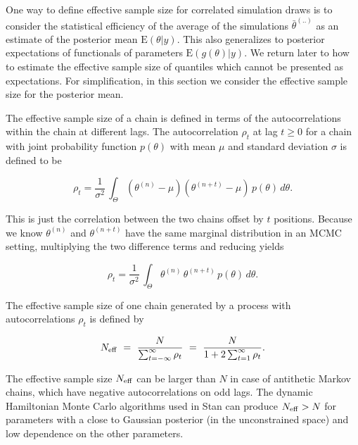 \documentclass[american,]{article}
\begin{document}
One way to define effective sample size for correlated simulation draws
is to consider the statistical efficiency of the average of the
simulations \(\bar{\theta}^{(..)}\) as an estimate of the posterior mean
\(\mbox{E}(\theta | y)\). This also generalizes to posterior
expectations of functionals of parameters \(\mbox{E}(g(\theta) | y)\).
We return later to how to estimate the effective sample size of
quantiles which cannot be presented as expectations. For simplification,
in this section we consider the effective sample size for the posterior
mean.

The effective sample size of a chain is defined in terms of the
autocorrelations within the chain at different lags. The autocorrelation
\(\rho_t\) at lag \(t \geq 0\) for a chain with joint probability
function \(p(\theta)\) with mean \(\mu\) and standard deviation \(\sigma\) is
defined to be

\begin{equation}
\rho_t = \frac{1}{\sigma^2} \, \int_{\Theta} (\theta^{(n)} - \mu)
(\theta^{(n+t)} - \mu) \, p(\theta) \, d \theta.
\end{equation}

This is just the correlation between the two chains offset by \(t\)
positions. Because we know \(\theta^{(n)}\) and \(\theta^{(n+t)}\) have
the same marginal distribution in an MCMC setting, multiplying the two
difference terms and reducing yields

\begin{equation}
\rho_t = \frac{1}{\sigma^2} \, \int_{\Theta} \theta^{(n)} \, \theta^{(n+t)}
\, p(\theta) \, d \theta.
\end{equation}

The effective sample size of one chain generated by a process with
autocorrelations \(\rho_t\) is defined by

\begin{equation}
N_{\rm eff} \ = \
\frac{N}{\sum_{t = -\infty}^{\infty} \rho_t} \ = \
\frac{N}{1 + 2 \sum_{t = 1}^{\infty} \rho_t}.
\end{equation}

The effective sample size \(N_{\rm eff}\) can be larger than \(N\) in case
of antithetic Markov chains, which have negative autocorrelations on odd
lags. The dynamic Hamiltonian Monte Carlo algorithms used in Stan
\citep{Hoffman+Gelman:2014, betancourt2017conceptual} can produce
\(N_{\rm eff}>N\) for parameters with a close to Gaussian posterior (in
the unconstrained space) and low dependence on the other parameters.
\end{document}
